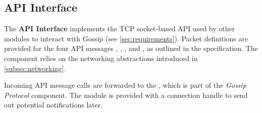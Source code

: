 \subsection{API Interface}\label{subsec:api-interface}

The \textbf{API Interface} implements the TCP socket-based API used by other modules to interact with Gossip (see \autoref{sec:requirements}).
Packet definitions are provided for the four API messages
, , , and , as outlined in the specification.
The component relies on the networking abstractions introduced in \autoref{subsec:networking}.

Incoming API message calls are forwarded to the , which is part of the \textit{Gossip Protocol} component.
The module is provided with a connection handle to send out potential notifications later.

